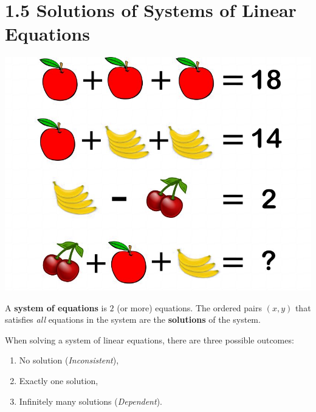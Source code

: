 \documentclass[../mathNotesPreamble]{subfiles}
\begin{document}
  \section{1.5 Solutions of Systems of Linear Equations}
  \begin{center}
    \includegraphics[width=0.65\linewidth]{images/fruit_math_puzzle}
  \end{center}

  \begin{defn*}
    A \textbf{system of equations} is $2$ (or more) equations. The ordered pairs $(x,y)$ that satisfies \emph{all} equations in the system are the \textbf{solutions} of the system.
  \end{defn*}

  When solving a system of linear equations, there are three possible outcomes:
  \begin{center}
    \begin{minipage}{0.5\linewidth}
      \begin{enumerate}
        \item No solution (\emph{Inconsistent}),
        \item Exactly one solution,
        \item Infinitely many solutions (\emph{Dependent}).
      \end{enumerate}
    \end{minipage}
  \end{center}
  \pagebreak
\end{document}
